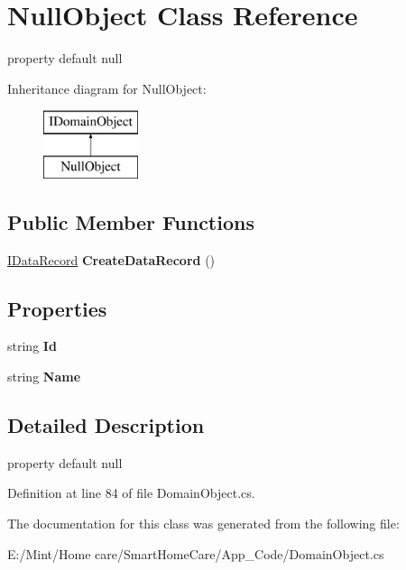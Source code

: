 \hypertarget{class_null_object}{\section{Null\-Object Class Reference}
\label{class_null_object}
}


property default null  


Inheritance diagram for Null\-Object\-:\begin{figure}[H]
\begin{center}
\leavevmode
\includegraphics[height=2.000000cm]{class_null_object}
\end{center}
\end{figure}
\subsection*{Public Member Functions}
\begin{DoxyCompactItemize}
\item 
\hypertarget{class_null_object_a53244f0fed2420b39466d57a25f1e287}{\hyperlink{interface_i_data_record}{I\-Data\-Record} {\bfseries Create\-Data\-Record} ()}\label{class_null_object_a53244f0fed2420b39466d57a25f1e287}

\end{DoxyCompactItemize}
\subsection*{Properties}
\begin{DoxyCompactItemize}
\item 
\hypertarget{class_null_object_a0fa0dbed3423f426f1dc4a0d612e581a}{string {\bfseries Id}}\label{class_null_object_a0fa0dbed3423f426f1dc4a0d612e581a}

\item 
\hypertarget{class_null_object_a59792d07ca1ea4d894cf64d0e0ef7d86}{string {\bfseries Name}}\label{class_null_object_a59792d07ca1ea4d894cf64d0e0ef7d86}

\end{DoxyCompactItemize}


\subsection{Detailed Description}
property default null 

Definition at line 84 of file Domain\-Object.\-cs.



The documentation for this class was generated from the following file\-:\begin{DoxyCompactItemize}
\item 
E\-:/\-Mint/\-Home care/\-Smart\-Home\-Care/\-App\-\_\-\-Code/Domain\-Object.\-cs\end{DoxyCompactItemize}
